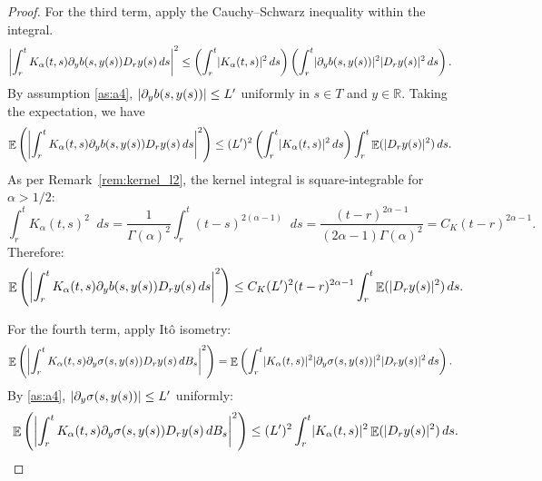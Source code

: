 \documentclass[11pt, a4paper]{article}
\theoremstyle{theoremstyle}
\theoremstyle{definitionstyle}
\newcommand{\dd}{\mathop{}\!d}
\DeclareMathOperator{\EE}{\mathbb E}
\DeclarePairedDelimiter{\abs}{\lvert}{\rvert}
\begin{document}
\begin{proof}
    For the third term, apply the Cauchy--Schwarz inequality within the integral.
    \begin{equation}
    \begin{aligned}
        \abs*{\int_r^t K_\alpha(t, s)\partial_yb(s, y(s))D_ry(s)\dd{s}}^2 &\leq \left (\int_r^t \abs{K_\alpha(t, s)}^2 \dd{s} \right ) \left (\int_r^t \abs{\partial_yb(s, y(s))}^2 \abs{D_ry(s)}^2 \dd{s} \right ).
    \end{aligned}
    \end{equation}
    By assumption \ref{as:a4}, $\abs{\partial_yb(s, y(s))} \leq L'$ uniformly in $s \in T$ and $y \in \mathbb{R}$. Taking the expectation, we have
    \begin{equation}
    \begin{aligned}
        \EE \left ( \abs*{\int_r^t K_\alpha(t, s)\partial_yb(s, y(s))D_ry(s)\dd{s}}^2 \right ) &\leq (L')^2 \left (\int_r^t \abs{K_\alpha(t, s)}^2 \dd{s} \right ) \int_r^t \EE(\abs{D_ry(s)}^2) \dd{s}.
    \end{aligned}
    \end{equation}
    As per Remark~\ref{rem:kernel_l2}, the kernel integral is square-integrable for $\alpha > 1/2$:
    \begin{equation}
        \int_r^t K_\alpha(t, s)^2 \dd{s} = \frac{1}{\Gamma(\alpha)^2}\int_r^t (t - s)^{2(\alpha - 1)} \dd{s} = \frac{(t - r)^{2\alpha - 1}}{(2\alpha - 1)\Gamma(\alpha)^2} = C_K(t - r)^{2\alpha - 1}.
    \end{equation}
    Therefore:
    \begin{equation}
        \EE \left ( \abs*{\int_r^t K_\alpha(t, s)\partial_yb(s, y(s))D_ry(s)\dd{s}}^2 \right ) \leq C_K(L')^2(t - r)^{2\alpha - 1} \int_r^t \EE(\abs{D_ry(s)}^2) \dd{s}.
    \end{equation}
    
    For the fourth term, apply It\^o isometry:
    \begin{equation}
    \begin{aligned}
        \EE \left ( \abs*{\int_r^t K_\alpha(t, s)\partial_y\sigma(s, y(s))D_ry(s)\dd{B_s}}^2 \right ) &= \EE \left ( \int_r^t \abs{K_\alpha(t, s)}^2 \abs{\partial_y\sigma(s, y(s))}^2 \abs{D_ry(s)}^2 \dd{s} \right ).
    \end{aligned}
    \end{equation}
    By \ref{as:a4}, $\abs{\partial_y\sigma(s, y(s))} \leq L'$ uniformly:
    \begin{equation}
        \EE \left ( \abs*{\int_r^t K_\alpha(t, s)\partial_y\sigma(s, y(s))D_ry(s)\dd{B_s}}^2 \right ) \leq (L')^2 \int_r^t \abs{K_\alpha(t, s)}^2 \EE(\abs{D_ry(s)}^2) \dd{s}.
    \end{equation}
    

\end{proof}
\end{document}
